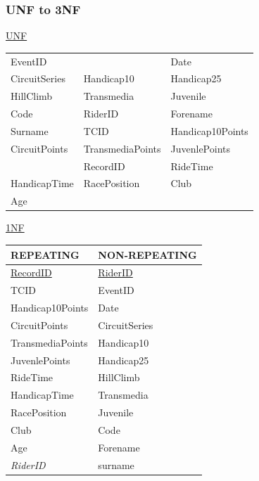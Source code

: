 \subsubsection{UNF to 3NF}
\underline{UNF}

\begin{tabular}{l l l}
EventID       &                  & Date \\
CircuitSeries & Handicap10       & Handicap25 \\
HillClimb     & Transmedia       & Juvenile \\
Code          & RiderID          & Forename \\
Surname       & TCID             & Handicap10Points \\
CircuitPoints & TransmediaPoints & JuvenlePoints \\
              & RecordID         & RideTime \\
HandicapTime  & RacePosition     & Club \\
Age           &                  & \\
\end{tabular}

\underline{1NF}

\begin{tabular}{|l|l|}
\hline
REPEATING            & NON-REPEATING       \\ \hline
\underline{RecordID} & \underline{RiderID} \\ \hline
TCID                 & EventID             \\ \hline
Handicap10Points     & Date                \\ \hline
CircuitPoints        & CircuitSeries       \\ \hline 
TransmediaPoints     & Handicap10          \\ \hline 
JuvenlePoints        & Handicap25          \\ \hline
RideTime             & HillClimb           \\ \hline 
HandicapTime         & Transmedia          \\ \hline
RacePosition         & Juvenile            \\ \hline
Club                 & Code                \\ \hline
Age                  & Forename            \\ \hline
\emph{RiderID}       & surname             \\ \hline

\end{tabular}

